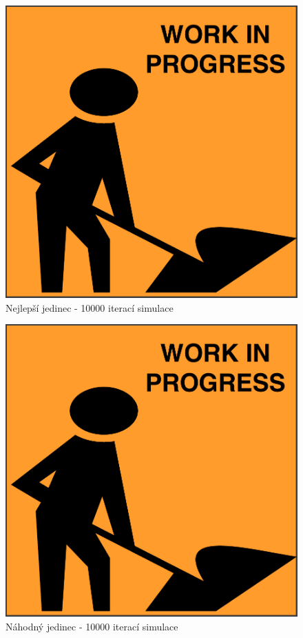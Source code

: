 \begin{figure}[p]\centering
	\includegraphics[width=\columnwidth]{../img/todo}
	\caption{Nejlepší jedinec - 10000 iterací simulace}
	\label{obr04:MineralBestEnd}
\end{figure}
\begin{figure}[p]\centering
	\includegraphics[width=\columnwidth]{../img/todo}
	\caption{Náhodný jedinec - 10000 iterací simulace}
	\label{obr04:MineralRandom end}
\end{figure}
\clearpage
\clearpage
